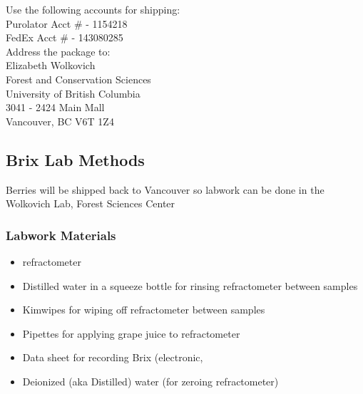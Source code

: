 \documentclass[11pt,letter]{article}
\newenvironment{smitemize}{
\begin{itemize}
  \setlength{\itemsep}{0pt}
  \setlength{\parskip}{0.8pt}
  \setlength{\parsep}{0pt}}
{\end{itemize}
}
\begin{document}
Use the following accounts for shipping: \\
Purolator Acct \# - 1154218 \\
FedEx Acct \# - 143080285 \\

Address the package to: \\
Elizabeth Wolkovich \\
Forest and Conservation Sciences \\
University of British Columbia \\
3041 - 2424 Main Mall \\
Vancouver, BC V6T 1Z4 \\

\subsection{Brix Lab Methods}
Berries will be shipped back to Vancouver so labwork can be done in the Wolkovich Lab, Forest Sciences Center

\subsubsection{Labwork Materials}
\begin{smitemize}
\item refractometer %
\item Distilled water in a squeeze bottle for rinsing refractometer between samples
\item Kimwipes for wiping off refractometer between samples
\item Pipettes for applying grape juice to refractometer 
\item Data sheet for recording Brix (electronic, %
\item Deionized (aka Distilled) water (for zeroing refractometer)

\end{smitemize}
\end{document}
